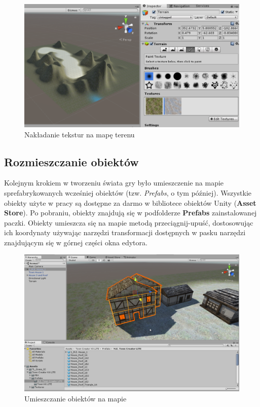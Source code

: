 \documentclass[openright]{xmgr}
\newcommand{\name}[1]{\textbf{\textcolor{NavyBlue}{#1}}}
\begin{document}
        \begin{figure}[H]
        \includegraphics[width=\textwidth]{teren_3.png}
        \caption{Nakładanie tekstur na mapę terenu}
        \end{figure}

    \subsection{Rozmieszczanie obiektów}

        Kolejnym krokiem w tworzeniu świata gry było umieszczenie na mapie sprefabrykowanych wcześniej obiektów (tzw. \textit{Prefabs}, o tym później). Wszystkie obiekty użyte w pracy są dostępne za darmo w bibliotece obiektów Unity (\name{Asset Store}). Po pobraniu, obiekty znajdują się w podfolderze \name{Prefabs} zainstalowanej paczki. Obiekty umieszcza się na mapie metodą przeciągnij-upuść, dostosowując ich koordynaty używając narzędzi transformacji dostępnych w pasku narzędzi znajdującym się w górnej części okna edytora.

        \begin{figure}[H]
        \includegraphics[width=\textwidth]{teren_obiekty.png}
        \caption{Umieszczanie obiektów na mapie}
        \end{figure}
\end{document}
